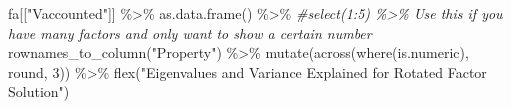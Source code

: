 \documentclass[
]{book}
\newenvironment{Shaded}{\begin{snugshade}}{\end{snugshade}}
\newcommand{\CommentTok}[1]{\textcolor[rgb]{0.56,0.35,0.01}{\textit{#1}}}
\newcommand{\DecValTok}[1]{\textcolor[rgb]{0.00,0.00,0.81}{#1}}
\newcommand{\FunctionTok}[1]{\textcolor[rgb]{0.00,0.00,0.00}{#1}}
\newcommand{\NormalTok}[1]{#1}
\newcommand{\SpecialCharTok}[1]{\textcolor[rgb]{0.00,0.00,0.00}{#1}}
\newcommand{\StringTok}[1]{\textcolor[rgb]{0.31,0.60,0.02}{#1}}
\begin{document}
\begin{Shaded}
\begin{Highlighting}[]
\NormalTok{fa[[}\StringTok{"Vaccounted"}\NormalTok{]] }\SpecialCharTok{\%\textgreater{}\%}
  \FunctionTok{as.data.frame}\NormalTok{() }\SpecialCharTok{\%\textgreater{}\%}
  \CommentTok{\#select(1:5) \%\textgreater{}\% Use this if you have many factors and only want to show a certain number}
  \FunctionTok{rownames\_to\_column}\NormalTok{(}\StringTok{"Property"}\NormalTok{) }\SpecialCharTok{\%\textgreater{}\%}
    \FunctionTok{mutate}\NormalTok{(}\FunctionTok{across}\NormalTok{(}\FunctionTok{where}\NormalTok{(is.numeric), round, }\DecValTok{3}\NormalTok{)) }\SpecialCharTok{\%\textgreater{}\%}
    \FunctionTok{flex}\NormalTok{(}\StringTok{"Eigenvalues and Variance Explained for Rotated Factor Solution"}\NormalTok{)}
\end{Highlighting}
\end{Shaded}

\providecommand{\docline}[3]{\noalign{\global\setlength{\arrayrulewidth}{#1}}\arrayrulecolor[HTML]{#2}\cline{#3}}

\setlength{\tabcolsep}{2pt}

\renewcommand*{\arraystretch}{1.5}
\end{document}

